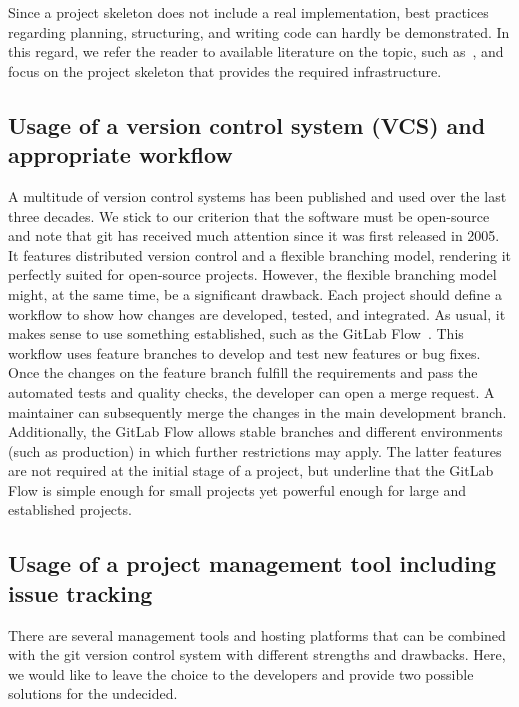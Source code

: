 \documentclass[@CLASSOPTIONS@]{tumarticle}
\begin{document}
Since a project skeleton does not include a real implementation, best
practices regarding planning, structuring, and writing code can hardly be
demonstrated. In this regard, we refer the reader to available literature on
the topic, such as~\cite{hunt1999pragmatic}, and focus on the project
skeleton that provides the required infrastructure.

\subsection{Usage of a version control system (VCS) and appropriate workflow}

A multitude of version control systems has been published and used over the
last three decades. We stick to our criterion that the software must be
open-source and note that git has received much attention since it was first
released in 2005. It features distributed version control and a flexible
branching model, rendering it perfectly suited for open-source projects.
However, the flexible branching model might, at the same time, be a
significant drawback. Each project should define a workflow to show how
changes are developed, tested, and integrated. As usual, it makes sense to
use something established, such as the GitLab Flow~\cite{gitlab-flow}. This
workflow uses feature branches to develop and test new features or bug fixes.
Once the changes on the feature branch fulfill the requirements and pass the
automated tests and quality checks, the developer can open a merge request.
A maintainer can subsequently merge the changes in the main development
branch. Additionally, the GitLab Flow allows stable branches and different
environments (such as production) in which further restrictions may apply.
The latter features are not required at the initial stage of a project, but
underline that the GitLab Flow is simple enough for small projects yet
powerful enough for large and established projects.

\subsection{Usage of a project management tool including issue tracking}

There are several management tools and hosting platforms that can be combined
with the git version control system with different strengths and drawbacks.
Here, we would like to leave the choice to the developers and provide two
possible solutions for the undecided.
\end{document}
